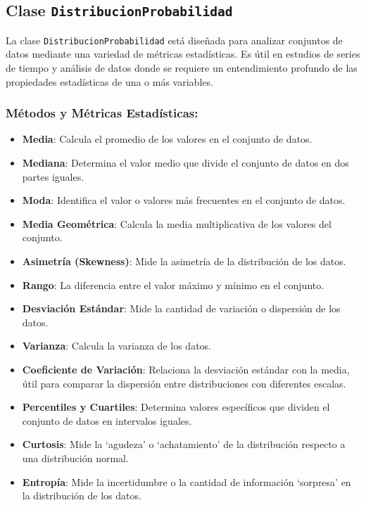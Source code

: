 \documentclass[11pt]{article}
\providecommand{\tightlist}{%
      \setlength{\itemsep}{0pt}\setlength{\parskip}{0pt}}
\begin{document}
    \hypertarget{clase-distribucionprobabilidad}{%
\subsection{\texorpdfstring{Clase
\texttt{DistribucionProbabilidad}}{Clase DistribucionProbabilidad}}\label{clase-distribucionprobabilidad}}

La clase \texttt{DistribucionProbabilidad} está diseñada para analizar
conjuntos de datos mediante una variedad de métricas estadísticas. Es
útil en estudios de series de tiempo y análisis de datos donde se
requiere un entendimiento profundo de las propiedades estadísticas de
una o más variables.

\hypertarget{muxe9todos-y-muxe9tricas-estaduxedsticas}{%
\subsubsection{Métodos y Métricas
Estadísticas:}\label{muxe9todos-y-muxe9tricas-estaduxedsticas}}

\begin{itemize}
\tightlist
\item
  \textbf{Media}: Calcula el promedio de los valores en el conjunto de
  datos.
\item
  \textbf{Mediana}: Determina el valor medio que divide el conjunto de
  datos en dos partes iguales.
\item
  \textbf{Moda}: Identifica el valor o valores más frecuentes en el
  conjunto de datos.
\item
  \textbf{Media Geométrica}: Calcula la media multiplicativa de los
  valores del conjunto.
\item
  \textbf{Asimetría (Skewness)}: Mide la asimetría de la distribución de
  los datos.
\item
  \textbf{Rango}: La diferencia entre el valor máximo y mínimo en el
  conjunto.
\item
  \textbf{Desviación Estándar}: Mide la cantidad de variación o
  dispersión de los datos.
\item
  \textbf{Varianza}: Calcula la varianza de los datos.
\item
  \textbf{Coeficiente de Variación}: Relaciona la desviación estándar
  con la media, útil para comparar la dispersión entre distribuciones
  con diferentes escalas.
\item
  \textbf{Percentiles y Cuartiles}: Determina valores específicos que
  dividen el conjunto de datos en intervalos iguales.
\item
  \textbf{Curtosis}: Mide la `agudeza' o `achatamiento' de la
  distribución respecto a una distribución normal.
\item
  \textbf{Entropía}: Mide la incertidumbre o la cantidad de información
  `sorpresa' en la distribución de los datos.
\end{itemize}
\end{document}

